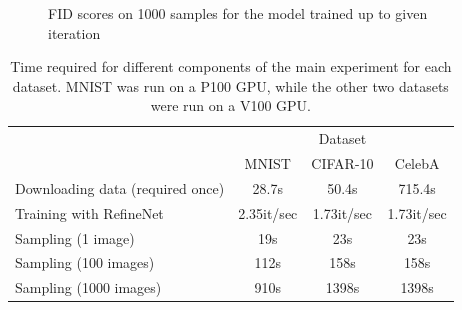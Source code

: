 \documentclass{article}
\begin{document}
\begin{figure}[h!]
    \centering
    \caption{FID scores on 1000 samples for the model trained up to given iteration}
    \label{fig:fid}
\end{figure}

\vspace{1cm}

\begin{table}[h!]
    \centering
    \begin{tabular}{l c c c}
    \toprule
         & \multicolumn{3}{c}{Dataset} \\ \cmidrule{2-4}
         & MNIST & CIFAR-10 & CelebA \\ \midrule     
    Downloading data (required once) & 28.7s & 50.4s & 715.4s \\
    Training with RefineNet & 2.35it/sec & 1.73it/sec & 1.73it/sec \\
    Sampling (1 image) & 19s & 23s & 23s \\
    Sampling (100 images) & 112s & 158s & 158s \\
    Sampling (1000 images) & 910s & 1398s & 1398s \\ \bottomrule
    \end{tabular}
    \vspace{3mm}
    \caption{Time required for different components of the main experiment for each dataset. MNIST was run on a P100 GPU, while the other two datasets were run on a V100 GPU.}
    \label{tab:times}
\end{table}
\end{document}
